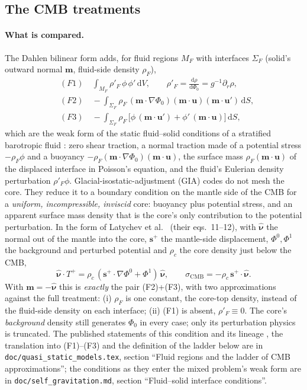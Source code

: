 \documentclass[11pt]{article}
\numberwithin{equation}{section}
\newcommand{\dS}{\,\mathrm{d}S}
\newcommand{\dV}{\,\mathrm{d}V}
\newcommand{\vu}{\mathbf{u}}
\newcommand{\vm}{\mathbf{m}}
\newcommand{\vs}{\mathbf{s}}
\newcommand{\code}[1]{\texttt{#1}}
\begin{document}
\subsection{The CMB treatments}
\label{sec:cmb}

\paragraph{What is compared.}
The Dahlen bilinear form adds, for fluid regions $M_F$ with interfaces
$\Sigma_F$ (solid's outward normal $\vm$, fluid-side density $\rho_F$),
\begin{align}
 &(F1)\quad \int_{M_F}\rho'_F\,\phi\,\phi'\dV, \qquad \rho'_F = \frac{\mathrm{d}\rho}{\mathrm{d}\Phi_0}
   = g^{-1}\partial_r\rho, \\
 &(F2)\quad -\int_{\Sigma_F}\rho_F\,(\vm\cdot\nabla\Phi_0)(\vm\cdot\vu)(\vm\cdot\vu')\dS, \\
 &(F3)\quad -\int_{\Sigma_F}\rho_F\,\bigl[\phi\,(\vm\cdot\vu') + \phi'\,(\vm\cdot\vu)\bigr]\dS ,
\end{align}
which are the weak form of the static fluid--solid conditions of a
stratified barotropic fluid \cite{Dahlen1974,AW10}: zero shear traction, a
normal traction made of a potential stress $-\rho_F\phi$ and a buoyancy
$-\rho_F(\vm\cdot\nabla\Phi_0)(\vm\cdot\vu)$, the surface mass
$\rho_F(\vm\cdot\vu)$ of the displaced interface in Poisson's equation, and
the fluid's Eulerian density perturbation $\rho'_F\phi$.
Glacial-isostatic-adjustment (GIA) codes do not mesh the core. They reduce
it to a boundary condition on the mantle side of the CMB for a
\emph{uniform, incompressible, inviscid} core: buoyancy plus potential
stress, and an apparent surface mass density that is the core's only
contribution to the potential perturbation. In the form of Latychev et al.\
\cite{Latychev2005} (their eqs.~11--12), with $\hat{\bm\nu}$ the normal out
of the mantle into the core, $\vs^+$ the mantle-side displacement,
$\Phi^0,\Phi^1$ the background and perturbed potential and $\rho_c$ the core
density just below the CMB,
\begin{equation}
  \hat{\bm{\nu}}\cdot T^+ = \rho_c\,(\vs^+\cdot\nabla\Phi^0 + \Phi^1)\,
    \hat{\bm{\nu}}, \qquad
  \sigma_{\mathrm{CMB}} = -\rho_c\,\vs^+\cdot\hat{\bm{\nu}} .
  \label{eq:latychev}
\end{equation}
With $\vm=-\hat{\bm\nu}$ this is \emph{exactly} the pair (F2)+(F3), with
two approximations against the full treatment: (i) $\rho_F$ is one
constant, the core-top density, instead of the fluid-side density on each
interface; (ii) (F1) is absent, $\rho'_F\equiv0$. The core's
\emph{background} density still generates $\Phi_0$ in every case; only its
perturbation physics is truncated. The published statements of this
condition and its lineage
\cite{WuPeltier1982,TrompMitrovica1999,Martinec1999,Martinec2000,Zhong2003,AWahrZhong2013,Huang2023,CitcomSVE2025,Spada2011,WuNi1996},
the translation into (F1)--(F3) and the definition of the ladder below are
in \code{doc/quasi\_static\_models.tex}, section ``Fluid regions and the
ladder of CMB approximations''; the conditions as they enter the mixed
problem's weak form are in \code{doc/self\_gravitation.md}, section
``Fluid--solid interface conditions''.
\end{document}
